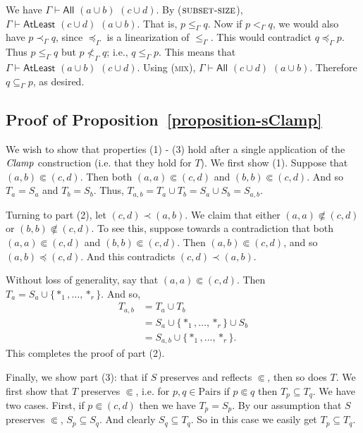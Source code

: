 \documentclass[letterpaper]{article} %
\theoremstyle{definition}
\newcommand{\set}[1]{\{ #1 \}}
\newcommand{\proverule}{\textsc}
\newcommand{\mix}{\proverule{mix}}
\newcommand{\All}[2]{\mathsf{All}\,\,#1\,\,#2}
\newcommand{\Atleast}[2]{\mathsf{AtLeast}\,\,#1\,\,#2}
\newcommand{\Pairs}{\mbox{Pairs}}
\newcommand{\Clamp}{\protect{\mbox{\textit{Clamp}}}}
\newcommand{\precsubseteq}{\Subset}
\newcommand{\provsub}{\subseteq_{\Gamma}}
\newcommand{\provle}{\le_{\Gamma}}
\newcommand{\provlt}{<_{\Gamma}}
\newcommand{\provlestrict}{\provlt}
\newcommand{\provextended}{\preceq_{\Gamma}}
\newcommand{\provextendedstrict}{\prec_{\Gamma}}
\begin{document}
We have $\Gamma \vdash \All{(a \cup b)}{(c \cup d)}$.  
    By ($\proverule{subset-size}$), $\Gamma \vdash \Atleast{(c \cup d)}{(a \cup b)}$.  
    That is,  $p\provle q$.
   Now if $p\provlestrict q$, we would also have $p\provextendedstrict q$,
    since $\provextended$ is a linearization of $\provle$.
    This would contradict  $q \provextended p$.  
     Thus  $p\provle q$ but $p \not \provlestrict q$; i.e.,
     $q\provle p$.  
     This means that 
     $\Gamma \vdash \Atleast{(a \cup b)}{(c \cup d)}$.  
     Using (\mix),  $\Gamma \vdash \All{(c \cup d)}{(a \cup b)}$.
     Therefore $q \provsub p$, as desired.

\subsection*{Proof of Proposition~\ref{proposition-sClamp}}

We wish to show that properties (1) - (3) hold after a single application of the $\Clamp$ construction (i.e. that they hold for $T$).  We first show (1).  Suppose that $(a, b) \Subset (c, d)$.  Then both $(a,a) \Subset (c,d)$ and $(b,b) \Subset (c,d)$.  And so $T_a = S_a$ and $T_b = S_b$.  Thus, $T_{a,b} = T_a \cup T_b = S_a \cup S_b = S_{a,b}$.
 
Turning to part (2), let  $(c,d) \prec (a,b)$.
 We claim that either $(a,a) \not \precsubseteq (c,d)$ or $(b,b) \not \precsubseteq (c,d)$.
To see this, suppose towards a contradiction that both $(a,a) \precsubseteq(c,d)$ and $(b,b) \precsubseteq (c,d)$.
 Then $(a,b) \precsubseteq (c,d)$, and so $(a,b) \preceq (c,d)$.  And this contradicts 
$(c,d) \prec (a,b)$.

Without loss of generality, say that $(a,a) \precsubseteq (c,d)$.
Then $T_a = S_a \cup \set{*_1,\ldots, *_r}$.
And so,
\begin{align*} T_{a,b} &= T_a \cup T_b\\ &= S_a\cup\set{*_1,\ldots, *_r} \cup S_b \\&= S_{a,b}\cup\set{*_1,\ldots, *_r}.
\end{align*}
This completes the proof of part (2).

Finally, we show part (3): that if $S$ preserves and reflects $\Subset$, then so does $T$.  We first show that $T$ preserves $\Subset$, i.e. for $p, q \in \Pairs$ if $p \Subset q$ then $T_p \subseteq T_q$.
We have two cases.  First, if $p \precsubseteq (c,d)$ then we have $T_p = S_p$.
By our assumption that $S$ preserves $\precsubseteq$, $S_p \subseteq S_q$.
And clearly $S_q \subseteq T_q$.
So in this case we easily get $T_p \subseteq T_q$.
\end{document}
